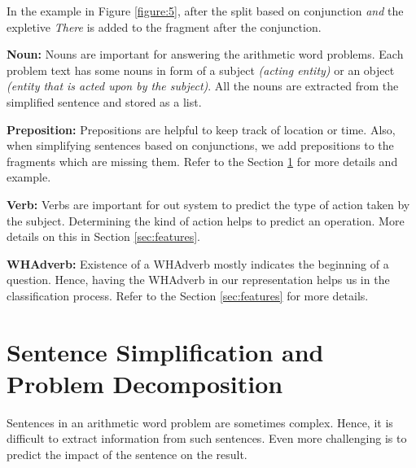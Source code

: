 \documentclass[11pt]{article}
\begin{document}
In the example in Figure \ref{figure:5}, after the split based on conjunction \textit{and} the expletive \textit{There} is added to the fragment after the conjunction.
\vspace{4mm}

\textbf{Noun:} Nouns are important for answering the arithmetic word problems. Each problem text has some nouns in form of a subject \textit{(acting entity)} or an object \textit{(entity that is acted upon by the subject)}. All the nouns are extracted from the simplified sentence and stored as a list. 
\vspace{4mm}

\textbf{Preposition:} Prepositions are helpful to keep track of location or time. Also, when simplifying sentences based on conjunctions, we add prepositions to the fragments which are missing them. Refer to the Section \ref{sec:sentencesimplification} for more details and example.
\vspace{4mm}

\newpage

\textbf{Verb:} Verbs are important for out system to predict the type of action taken by the subject. Determining the kind of action helps to predict an operation. More details on this in Section \ref{sec:features}.
\vspace{4mm}

\textbf{WHAdverb:} Existence of a WHAdverb mostly indicates the beginning of a question. Hence, having the WHAdverb in our representation helps us in the classification process. Refer to the Section \ref{sec:features} for more details.

\section{Sentence Simplification and Problem Decomposition} \label{sec:sentencesimplification}
Sentences in an arithmetic word problem are sometimes complex. Hence, it is difficult to extract information from such sentences. Even more challenging is to predict the impact of the sentence on the result. 
\end{document}
